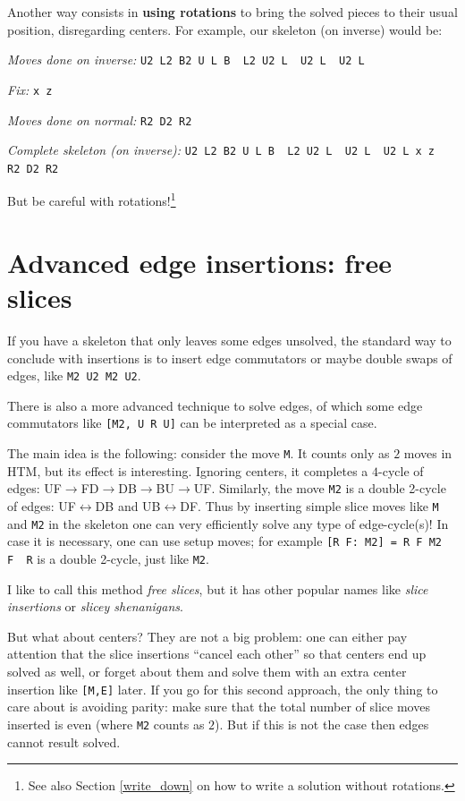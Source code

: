 \documentclass[11pt,a4paper]{book}
\newcommand{\p}{\textquotesingle}
\newcommand{\m}{\texttt}
\newcommand{\ps}{\p\,\,}
\begin{document}
Another way consists in \textbf{using rotations} to bring the solved pieces to their usual position, disregarding centers. For example, our skeleton (on inverse) would be:

\vspace{0.2cm}
\emph{Moves done on inverse:} \m{U2 L2 B2 U L B\ps L2 U2 L\ps U2 L\ps U2 L}

\emph{Fix:} \m{x z\p}

\emph{Moves done on normal:} \m{R2 D2 R2}

\emph{Complete skeleton (on inverse):} \m{U2 L2 B2 U L B\ps L2 U2 L\ps U2 L\ps U2 L x z\ps R2 D2 R2}
\vspace{0.2cm}

But be careful with rotations!\footnote{See also Section \ref{write_down} on how to write a solution without rotations.}

\section{Advanced edge insertions: free slices}
\label{slices}

If you have a skeleton that only leaves some edges unsolved, the standard way to conclude with insertions is to insert edge commutators or maybe double swaps of edges, like \m{M2 U2 M2 U2}.

There is also a more advanced technique to solve edges, of which some edge commutators like \m{[M2, U R U\p]} can be interpreted as a special case. 

The main idea is the following: consider the move \m{M}. It counts only as $2$ moves in HTM, but its effect is interesting. Ignoring centers, it completes a $4$-cycle of edges: UF$\to$FD$\to$DB$\to$BU$\to$UF. Similarly, the move \m{M2} is a double 2-cycle of edges: UF$\leftrightarrow$DB and UB$\leftrightarrow$DF. Thus by inserting simple slice moves like \m{M} and \m{M2} in the skeleton one can very efficiently solve any type of edge-cycle(s)! In case it is necessary, one can use setup moves; for example \m{[R F: M2] = R F M2 F\ps R\p} is a double 2-cycle, just like \m{M2}.

I like to call this method \emph{free slices}, but it has other popular names like \emph{slice insertions} or \emph{slicey shenanigans}.

But what about centers? They are not a big problem: one can either pay attention that the slice insertions ``cancel each other'' so that centers end up solved as well, or forget about them and solve them with an extra center insertion like \m{[M,E]} later. If you go for this second approach, the only thing to care about is avoiding parity: make sure that the total number of slice moves inserted is even (where \m{M2} counts as $2$). But if this is not the case then edges cannot result solved.
\end{document}
